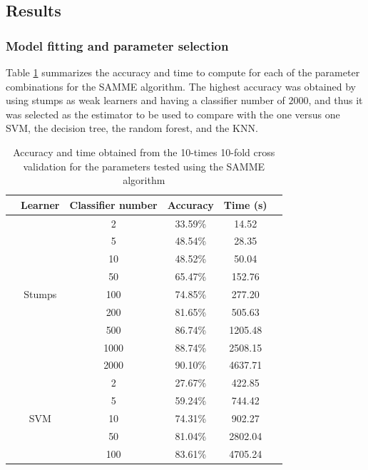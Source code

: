 \documentclass{article}
\begin{document}
\subsection{Results}
\subsubsection{Model fitting and parameter selection}
Table \ref{tab:SAMME_comparison} summarizes the accuracy and time to compute for each of the parameter combinations for the SAMME algorithm.
The highest accuracy was obtained by using stumps as weak learners and having a classifier number of $2000$, and thus it was selected as the estimator to be used to compare with the one versus one SVM, the decision tree, the random forest, and the KNN.

\begin{table}[tb]
\centering
\caption{Accuracy and time obtained from the 10-times 10-fold cross validation for the parameters tested using the SAMME algorithm}
\label{tab:SAMME_comparison}
\begin{tabular}{@{}cccccc@{}}
\toprule
 & Learner                 & Classifier number & Accuracy & Time (s) &  \\ \midrule
 & \multirow{9}{*}{Stumps} & 2                 & 33.59\%  & 14.52    &  \\
 &                         & 5                 & 48.54\%  & 28.35    &  \\
 &                         & 10                & 48.52\%  & 50.04    &  \\
 &                         & 50                & 65.47\%  & 152.76   &  \\
 &                         & 100               & 74.85\%  & 277.20   &  \\
 &                         & 200               & 81.65\%  & 505.63   &  \\
 &                         & 500               & 86.74\%  & 1205.48  &  \\
 &                         & 1000              & 88.74\%  & 2508.15  &  \\
 &                         & 2000              & 90.10\%  & 4637.71  &  \\ \cmidrule(lr){2-5}
 & \multirow{5}{*}{SVM}    & 2                 & 27.67\%  & 422.85   &  \\
 &                         & 5                 & 59.24\%  & 744.42   &  \\
 &                         & 10                & 74.31\%  & 902.27   &  \\
 &                         & 50                & 81.04\%  & 2802.04  &  \\
 &                         & 100               & 83.61\%  & 4705.24  &  \\ \bottomrule
\end{tabular}
\end{table}
\end{document}
